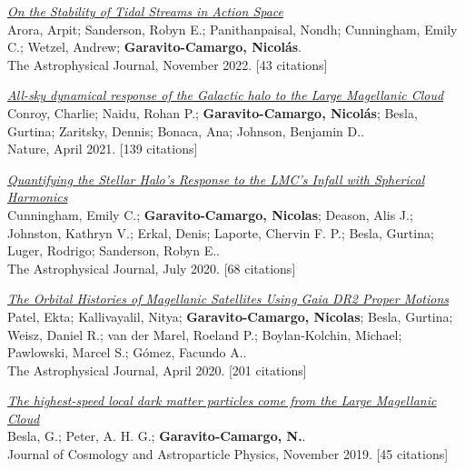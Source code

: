 \documentclass[14pt]{article}
\begin{document}
\begin{etaremune}
\item \textit{\href{https://ui.adsabs.harvard.edu/abs/2022ApJ...939....2A/abstract}{On the Stability of Tidal Streams in Action Space}}\\
  {\small \color{darkgray} Arora, Arpit; Sanderson, Robyn E.; Panithanpaisal, Nondh; Cunningham, Emily C.; Wetzel, Andrew; \textbf{Garavito-Camargo, Nicolás}.\\
  The Astrophysical Journal, November 2022. [43 citations]}

\item \textit{\href{https://ui.adsabs.harvard.edu/abs/2021Natur.592..534C/abstract}{All-sky dynamical response of the Galactic halo to the Large Magellanic Cloud}}\\
  {\small \color{darkgray} Conroy, Charlie; Naidu, Rohan P.; \textbf{Garavito-Camargo, Nicolás}; Besla, Gurtina; Zaritsky, Dennis; Bonaca, Ana; Johnson, Benjamin D..\\
  Nature, April 2021. [139 citations]}

\item \textit{\href{https://ui.adsabs.harvard.edu/abs/2020ApJ...898....4C/abstract}{Quantifying the Stellar Halo's Response to the LMC's Infall with Spherical Harmonics}}\\
  {\small \color{darkgray} Cunningham, Emily C.; \textbf{Garavito-Camargo, Nicolas}; Deason, Alis J.; Johnston, Kathryn V.; Erkal, Denis; Laporte, Chervin F. P.; Besla, Gurtina; Luger, Rodrigo; Sanderson, Robyn E..\\
  The Astrophysical Journal, July 2020. [68 citations]}

\item \textit{\href{https://ui.adsabs.harvard.edu/abs/2020ApJ...893..121P/abstract}{The Orbital Histories of Magellanic Satellites Using Gaia DR2 Proper Motions}}\\
  {\small \color{darkgray} Patel, Ekta; Kallivayalil, Nitya; \textbf{Garavito-Camargo, Nicolas}; Besla, Gurtina; Weisz, Daniel R.; van der Marel, Roeland P.; Boylan-Kolchin, Michael; Pawlowski, Marcel S.; Gómez, Facundo A..\\
  The Astrophysical Journal, April 2020. [201 citations]}

\item \textit{\href{https://ui.adsabs.harvard.edu/abs/2019JCAP...11..013B/abstract}{The highest-speed local dark matter particles come from the Large Magellanic Cloud}}\\
  {\small \color{darkgray} Besla, G.; Peter, A. H. G.; \textbf{Garavito-Camargo, N.}.\\
  Journal of Cosmology and Astroparticle Physics, November 2019. [45 citations]}


\end{etaremune}
\end{document}
